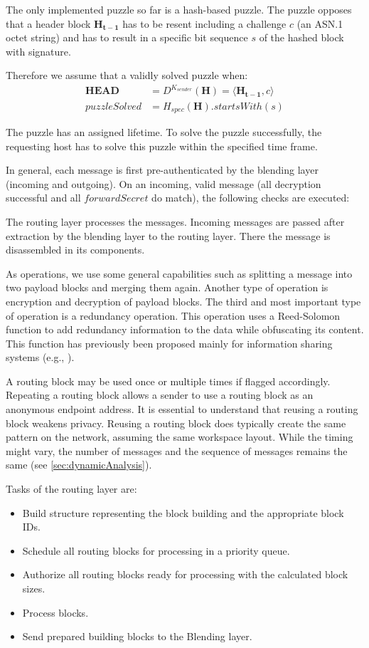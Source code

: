 \documentclass[acmsmall, screen]{acmart}
\begin{document}
The only implemented puzzle so far is a hash-based puzzle. The puzzle opposes that a header block $\mathbf{H_{t-1}}$ has to be resent including a challenge $c$ (an ASN.1 octet string) and has to result in a specific bit sequence $s$ of the hashed block with signature.

Therefore we assume that a validly solved puzzle when:
\begin{eqnarray}
\mathbf{HEAD}&= D^{K_{sender}}\left(\mathbf{H}\right) = \langle \mathbf{H_{t-1}}, c\rangle\\
puzzleSolved&= H_{spec}(\mathbf{H}).startsWith(s)
\end{eqnarray}

The puzzle has an assigned lifetime. To solve the puzzle successfully, the requesting host has to solve this puzzle within the specified time frame. 

In general, each message is first pre-authenticated by the blending layer (incoming and outgoing). On an incoming, valid message (all decryption successful and all $forwardSecret$ do match), the following checks are executed:

The routing layer processes the messages. Incoming messages are passed after extraction by the blending layer to the routing layer. There the message is disassembled in its components.

As operations, we use some general capabilities such as splitting a message into two payload blocks and merging them again. Another type of operation is encryption and decryption of payload blocks. The third and most important type of operation is a redundancy operation. This operation uses a Reed-Solomon\cite{reed1960polynomial} function to add redundancy information to the data while obfuscating its content. This function has previously been proposed mainly for information sharing systems (e.g., \cite{mceliece1981sharing}).

A routing block may be used once or multiple times if flagged accordingly. Repeating a routing block allows a sender to use a routing block as an anonymous endpoint address. It is essential to understand that reusing a routing block weakens privacy. Reusing a routing block does typically create the same pattern on the network, assuming the same workspace layout. While the timing might vary, the number of messages and the sequence of messages remains the same (see \ref{sec:dynamicAnalysis}).

Tasks of the routing layer are:
\begin{itemize}
	\item Build structure representing the block building and the appropriate block IDs.
	\item Schedule all routing blocks for processing in a priority queue.
	\item Authorize all routing blocks ready for processing with the calculated block sizes.
	\item Process blocks.
	\item Send prepared building blocks to the Blending layer.
\end{itemize}
\end{document}
